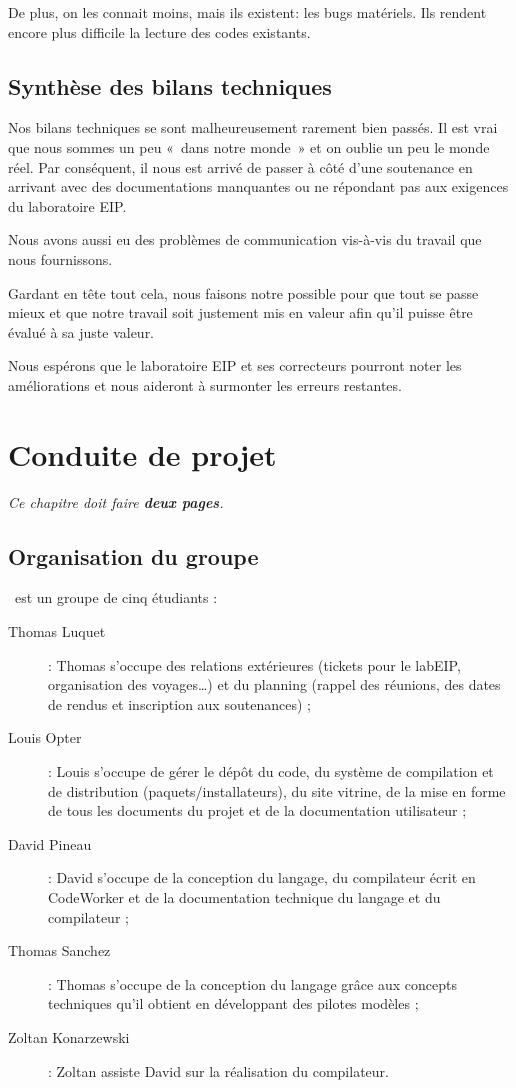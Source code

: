 \documentclass[francais]{rtxreport}
\begin{document}
De plus, on les connait moins, mais ils existent: les bugs matériels. Ils
rendent encore plus difficile la lecture des codes existants.

\section{Synthèse des bilans techniques}

Nos bilans techniques se sont malheureusement rarement bien passés. Il est vrai
que nous sommes un peu «~dans notre monde~» et on oublie un peu le monde réel.
Par conséquent, il nous est arrivé de passer à côté d’une soutenance en arrivant
avec des documentations manquantes ou ne répondant pas aux exigences du
laboratoire EIP.

Nous avons aussi eu des problèmes de communication vis-à-vis du travail que nous
fournissons.

Gardant en tête tout cela, nous faisons notre possible pour que tout se passe
mieux et que notre travail soit justement mis en valeur afin qu’il puisse être
évalué à sa juste valeur.

Nous espérons que le laboratoire EIP et ses correcteurs pourront noter les
améliorations et nous aideront à surmonter les erreurs restantes.

\chapter{Conduite de projet}

\emph{Ce chapitre doit faire \textbf{deux pages}.}

\section{Organisation du groupe}

\rtx\ est un groupe de cinq étudiants :
\begin{description}
\item[Thomas Luquet] : Thomas s'occupe des relations extérieures (tickets pour
  le labEIP, organisation des voyages\ldots) et du planning (rappel des
  réunions, des dates de rendus et inscription aux soutenances) ;
\item[Louis Opter] : Louis s'occupe de gérer le dépôt du code, du système de
  compilation et de distribution (paquets/installateurs), du site vitrine, de la
  mise en forme de tous les documents du projet et de la documentation
  utilisateur ;
\item[David Pineau] : David s'occupe de la conception du langage, du compilateur
  écrit en CodeWorker et de la documentation technique du langage et du
  compilateur ;
\item[Thomas Sanchez] : Thomas s'occupe de la conception du langage grâce aux
  concepts techniques qu'il obtient en développant des pilotes modèles ;
\item[Zoltan Konarzewski] : Zoltan assiste David sur la réalisation du
  compilateur.
\end{description}
\end{document}
